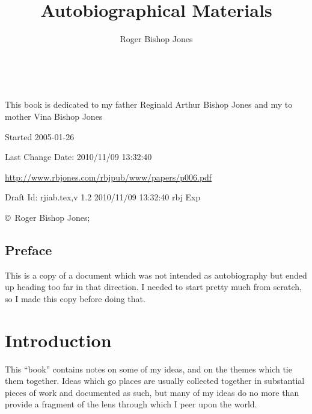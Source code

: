 \documentclass[10pt,titlepage]{book}
\title{Autobiographical Materials}
\author{Roger Bishop Jones}
\date{\ }
\begin{document}
\frontmatter

\begin{titlepage}
\maketitle

\vfill


\begin{centering}

{\parskip=0.3in
This book is dedicated to my father
\vfil
{ Reginald Arthur Bishop Jones}
\vfil
and my to mother
\vfil
{ Vina Bishop Jones}
}

\vfill

\footnotesize{
Started 2005-01-26

Last Change $ $Date: 2010/11/09 13:32:40 $ $

\href{http://www.rbjones.com/rbjpub/www/papers/p006.pdf}{http://www.rbjones.com/rbjpub/www/papers/p006.pdf}

Draft $ $Id: rjiab.tex,v 1.2 2010/11/09 13:32:40 rbj Exp $ $

\copyright\ Roger Bishop Jones;

}%
\end{centering}

\thispagestyle{empty}
\end{titlepage}

{\parskip=0pt\tableofcontents}


\mainmatter

\section*{Preface}

This is a copy of a document which was not intended as autobiography but ended up heading too far in that direction.
I needed to start pretty much from scratch, so I made this copy before doing that.

\chapter{Introduction}

This ``book'' contains notes on some of my ideas, and on the themes which tie them together.
Ideas which go places are usually collected together in substantial pieces of work and documented as such, but many of my ideas do no more than provide a fragment of the lens through which I peer upon the world.
\end{document}
